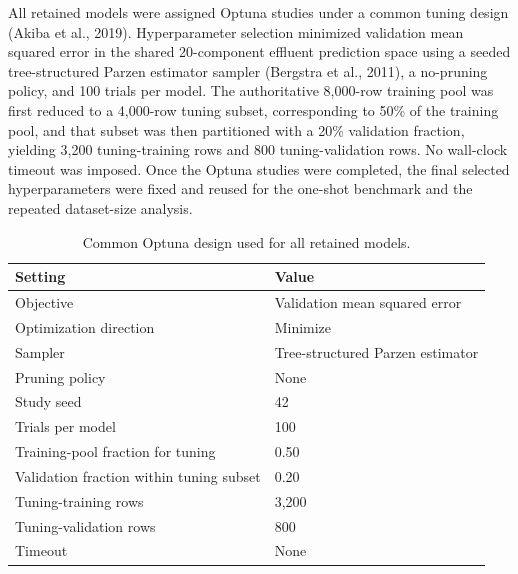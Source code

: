 \documentclass[a4paper,fleqn]{cas-sc}
\newenvironment{revblock}{\begingroup\color{revDefault}}{\endgroup}
\newenvironment{revblockr24}{\begingroup\color{revRtwoFour}}{\endgroup}
\begin{document}
\begin{revblock}
\begin{revblockr24}
All retained models were assigned Optuna studies under a common tuning design (Akiba et al., 2019). Hyperparameter selection minimized validation mean squared error in the shared 20-component effluent prediction space using a seeded tree-structured Parzen estimator sampler (Bergstra et al., 2011), a no-pruning policy, and 100 trials per model. The authoritative 8,000-row training pool was first reduced to a 4,000-row tuning subset, corresponding to 50\% of the training pool, and that subset was then partitioned with a 20\% validation fraction, yielding 3,200 tuning-training rows and 800 tuning-validation rows. No wall-clock timeout was imposed. Once the Optuna studies were completed, the final selected hyperparameters were fixed and reused for the one-shot benchmark and the repeated dataset-size analysis.

\begin{table}[H]
\centering
\caption{Common Optuna design used for all retained models.}
\label{tab:optuna_design}
\scriptsize
\begin{tabular}{ll}
\hline
Setting & Value \\
\hline
Objective & Validation mean squared error \\
Optimization direction & Minimize \\
Sampler & Tree-structured Parzen estimator \\
Pruning policy & None \\
Study seed & 42 \\
Trials per model & 100 \\
Training-pool fraction for tuning & 0.50 \\
Validation fraction within tuning subset & 0.20 \\
Tuning-training rows & 3,200 \\
Tuning-validation rows & 800 \\
Timeout & None \\
\hline
\end{tabular}
\end{table}


\end{revblockr24}
\end{revblock}
\end{document}

